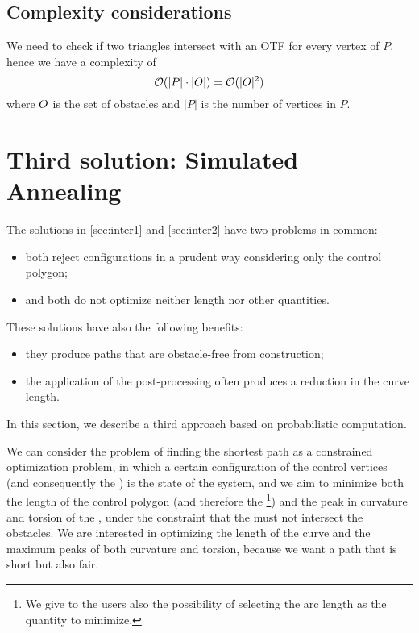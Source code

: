 \documentclass[dissertation.tex]{subfiles}
\begin{document}
\subsection{Complexity considerations}
We need to check if two triangles intersect
with an \ac{OTF} for every vertex of $P$, hence we have a complexity of
\begin{equation*}
  \mathcal{O}(|P|\cdot|O|)=\mathcal{O}(|O|^2)
\end{equation*}
where $O$ is the set of obstacles and $|P|$ is the number of vertices
in $P$.

\section{Third solution: Simulated Annealing}\label{sec:inter3}
The solutions in \cref{sec:inter1} and \cref{sec:inter2} have two
problems in common:
\begin{itemize}
\item both reject configurations in a prudent way
  considering only the control polygon;
\item and both do not optimize neither
  length nor other quantities.
\end{itemize}
These solutions have also the following benefits:
\begin{itemize}
\item they produce paths that are obstacle-free from construction;
\item the application of the post-processing often produces a reduction
  in the curve length.
\end{itemize}

In this section, we describe a third
approach based on
probabilistic computation.
    
We can consider the problem of finding the shortest path as a constrained
optimization problem, in which a certain configuration of the control
vertices (and
consequently the \bs) is the state of the system, and we aim to
minimize both the length of the control polygon (and therefore the
\bs\footnote{We give to the users also the possibility of selecting the
  arc length as the quantity to minimize.}) and the peak in curvature and torsion of the \bs, under
the constraint that the \bs must not intersect the obstacles. We
are interested in optimizing the length of the curve and the maximum
peaks of both curvature and torsion, because we want a path that is
short but also fair. 
\end{document}
